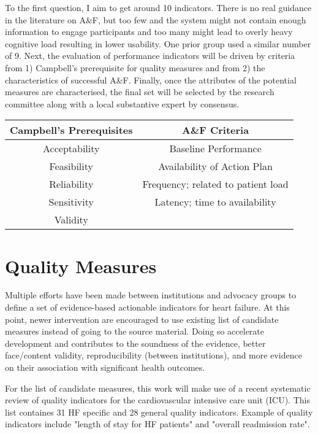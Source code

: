 To the first question, I aim to get around 10 indicators. There is no real guidance in the literature on A\&F, but too few and the system might not contain enough information to engage participants and too many might lead to overly heavy cognitive load resulting in lower usability. One prior group used a similar number of 9.\cite{matthews2007impact} Next, the evaluation of performance indicators will be driven by criteria from 1) Campbell's prerequisite for quality measures\cite{campbell2002research} and from 2) the characteristics of successful A\&F\cite{ivers2012audit}. Finally, once the attributes of the potential measures are characterised, the final set will be selected by the research committee along with a local substantive expert by consensus.

\begin{center}
    \begin{tabular}{ c|c }
         \textbf{Campbell's Prerequisites} & \textbf{A\&F Criteria}  \\ 
         \hline
         Acceptability & Baseline Performance  \\  
         Feasibility & Availability of Action Plan \\
         Reliability & Frequency; related to patient load \\
         Sensitivity & Latency; time to availability \\
         Validity &  \\
    \end{tabular}
\end{center}

\section{Quality Measures}
Multiple efforts have been made between institutions and advocacy groups to define a set of evidence-based actionable indicators for heart failure.\cite{hong2006overview}\cite{fonarow2010improving} \cite{kelley2006health} At this point, newer intervention are encouraged to use existing list of candidate measures instead of going to the source material. Doing so accelerate development and contributes to the soundness of the evidence, better face/content validity, reproducibility (between institutions), and more evidence on their association with significant health outcomes.\cite{smith2009performance}

For the list of candidate measures, this work will make use of a recent systematic review of quality indicators for the cardiovascular  intensive care unit (\gls{ICU}). This list containes 31 \gls{HF} specific and 28 general quality indicators. Example of quality indicators include "length of stay for HF patients" and "overall readmission rate".\cite{goldfarb2018systematic}

